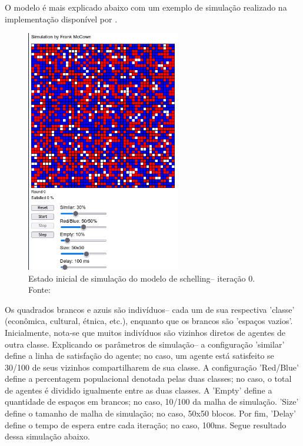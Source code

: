 O modelo é mais explicado abaixo com um exemplo de simulação realizado na implementação disponível por \citet{mccown_schellings_nodate}.
\begin{figure}
    \centering
    \includegraphics[width=0.6\textwidth]{exploratory-data-analysis/bananaMoshpit/PesqBibliogr/SimulacaoMultiagente/schelling-FM-initial.png}
    \caption{Estado inicial de simulação do modelo de schelling-- iteração 0. Fonte: \citet{mccown_schellings_nodate}}
    \label{STL@bananaMoshpit-schelling-init}
\end{figure}

Os quadrados brancos e azuis são indivíduos-- cada um de sua respectiva 'classe' (econômica, cultural, étnica, etc.), enquanto que os brancos são 'espaços vazios'. Inicialmente, nota-se que muitos indivíduos são vizinhos diretos de agentes de outra classe. Explicando os parâmetros de simulação-- a configuração 'similar' define a linha de satisfação do agente; no caso, um agente está satisfeito se 30/100 de seus vizinhos compartilharem de sua classe. A configuração 'Red/Blue' define a percentagem populacional denotada pelas duas classes; no caso, o total de agentes é dividido igualmente entre as duas classes. A 'Empty' define a quantidade de espaços em brancos; no caso, 10/100 da malha de simulação. 'Size' define o tamanho de malha de simulação; no caso, 50x50 blocos. Por fim, 'Delay' define o tempo de espera entre cada iteração; no caso, 100ms. Segue  resultado dessa simulação abaixo.

